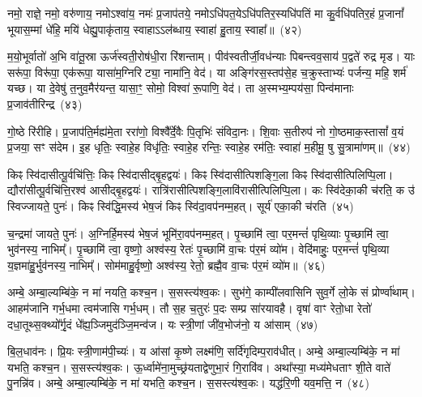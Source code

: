 {\anuvakamend[{वि॒वि॒दद्द्वे च॑}]}%

नमो॒ राज्ञे॒ नमो॒ वरु॑णाय॒ नमो\-ऽश्वा॑य॒ नमः॑ प्र॒जाप॑तये॒ नमो\-ऽधि॑पत॒ये\-ऽधि॑पतिर॒स्यधि॑पतिं मा कु॒र्वधि॑पतिर॒हं प्र॒जानां᳚ भूयास॒म्मां धे॑हि॒ मयि॑ धेह्यु॒पाकृ॑ताय॒ स्वाहा\-ऽ\-ऽल॑ब्धाय॒ स्वाहा॑ हु॒ताय॒ स्वाहा᳚॥~(४२)

{\anuvakamend[{नम॒ एका॒न्नत्रि॒ꣳ॒शत्}]}%

म॒यो॒भूर्वातो॑ अ॒भि वा॑तू॒स्रा ऊर्ज॑स्वती॒रोष॑धी॒रा रि॑शन्ताम्। पीव॑स्वतीर्जी॒वध॑न्याः पिबन्त्वव॒साय॑ प॒द्वते॑ रुद्र मृड। याः सरू॑पा॒ विरू॑पा॒ एक॑रूपा॒ यासा॑म॒ग्निरिट्या॒ नामा॑नि॒ वेद॑। या अङ्गि॑रस॒स्तप॑से॒ह च॒क्रुस्ताभ्यः॑ पर्जन्य॒ महि॒ शर्म॑ यच्छ। या दे॒वेषु॑ त॒नुव॒मैर॑यन्त॒ यासा॒ꣳ॒ सोमो॒ विश्वा॑ रू॒पाणि॒ वेद॑। ता अ॒स्मभ्य॒म्पय॑सा॒ पिन्व॑मानाः प्र॒जाव॑तीरिन्द्र~(४३)

गो॒ष्ठे रि॑रीहि। प्र॒जा\-प॑ति॒र्मह्य॑मे॒ता ररा॑णो॒ विश्वै᳚र्दे॒वैः पि॒तृभिः॑ संविदा॒नः। शि॒वाः स॒तीरुप॑ नो गो॒ष्ठमाक॒स्तासां᳚ व॒यं प्र॒जया॒ सꣳ स॑देम। इ॒ह धृतिः॒ स्वाहे॒ह विधृ॑तिः॒ स्वाहे॒ह रन्तिः॒ स्वाहे॒ह रम॑तिः॒ स्वाहा॑ म॒हीमू॒ षु सु॒त्रामा॑णम्॥~(४४)

{\anuvakamend[{इ॒न्द्रा॒ष्टात्रिꣳ॑शच्च}]}%

किꣴ स्वि॑दासीत्पू॒र्वचि॑त्तिः॒ किꣴ स्वि॑दासीद्बृ॒हद्वयः॑। किꣴ स्वि॑दासीत्पिशङ्गि॒ला किꣴ स्वि॑दासीत्पिलिप्पि॒ला। द्यौरा॑सीत्पू॒र्वचि॑त्ति॒रश्व॑ आसीद्बृ॒हद्वयः॑। रात्रि॑रासीत्पिशङ्गि॒लावि॑रासीत्पिलिप्पि॒ला। कः स्वि॑देका॒की च॑रति॒ क उ॑ स्विज्जायते॒ पुनः॑। किꣴ स्वि॑द्धि॒मस्य॑ भेष॒जं किꣴ स्वि॑दा॒वप॑नम्म॒हत्। सूर्य॑ एका॒की च॑रति~(४५)

च॒न्द्रमा॑ जायते॒ पुनः॑। अ॒ग्निर्\mbox{}हि॒मस्य॑ भेष॒जं भूमि॑रा॒वप॑नम्म॒हत्। पृ॒च्छामि॑ त्वा॒ पर॒मन्तं॑ पृथि॒व्याः पृ॒च्छामि॑ त्वा॒ भुव॑नस्य॒ नाभिम्᳚। पृ॒च्छामि॑ त्वा॒ वृष्णो॒ अश्व॑स्य॒ रेतः॑ पृ॒च्छामि॑ वा॒चः प॑र॒मं व्यो॑म। वेदि॑माहुः॒ पर॒मन्तं॑ पृथि॒व्या य॒ज्ञमा॑हु॒र्भुव॑नस्य॒ नाभिम्᳚। सोम॑माहु॒र्वृष्णो॒ अश्व॑स्य॒ रेतो॒ ब्रह्मै॒व वा॒चः प॑र॒मं व्यो॑म॥~(४६)

{\anuvakamend[{सूर्य॑ एका॒की च॑रति॒ षट्च॑त्वारिꣳशच्च}]}%

अम्बे॒ अम्बा॒ल्यम्बि॑के॒ न मा॑ नयति॒ कश्च॒न। स॒सस्त्य॑श्व॒कः। सुभ॑गे॒ काम्पी॑लवासिनि सुव॒र्गे लो॒के सं प्रोर्ण्वा॑थाम्। आहम॑जानि गर्भ॒धमा त्वम॑जासि गर्भ॒धम्। तौ स॒ह च॒तुरः॑ प॒दः सम्प्र सा॑रयावहै। वृषा॑ वाꣳ रेतो॒धा रेतो॑ दधा॒तूथ्स॒क्थ्यो᳚र्गृ॒दं धे᳚ह्य॒ञ्जिमुद॑ञ्जि॒मन्व॑ज। यः स्त्री॒णां जी॑व॒भोज॑नो॒ य आ॑साम्~(४७)

बि॒ल॒धाव॑नः। प्रि॒यः स्त्री॒णाम॑पी॒च्यः॑। य आ॑सां कृ॒ष्णे लक्ष्म॑णि॒ सर्दि॑गृदिम्प॒राव॑धीत्। अम्बे॒ अम्बा॒ल्यम्बि॑के॒ न मा॑ यभति॒ कश्च॒न। स॒सस्त्य॑श्व॒कः। ऊ॒र्ध्वामे॑ना॒मुच्छ्र॑यताद्वेणुभा॒रं गि॒रावि॑व। अथा᳚स्या॒ मध्य॑मेधताꣳ शी॒ते वाते॑ पु॒नन्नि॑व। अम्बे॒ अम्बा॒ल्यम्बि॑के॒ न मा॑ यभति॒ कश्च॒न। स॒सस्त्य॑श्व॒कः। यद्ध॑रि॒णी यव॒मत्ति॒ न~(४८)

